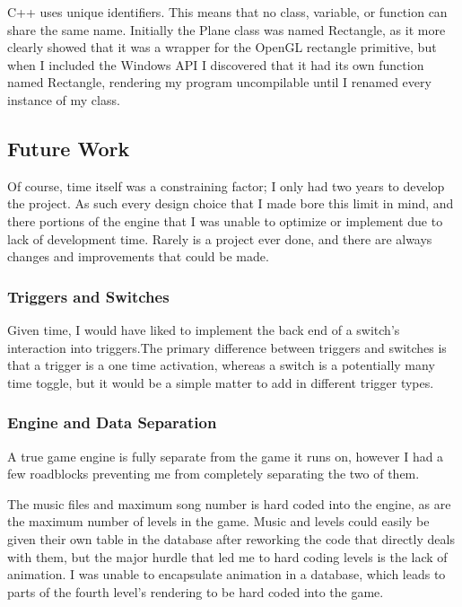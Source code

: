 \documentclass{article}
\begin{document}
C++ uses unique identifiers. This means that no class, variable, or function can share the same name. Initially the Plane class was named Rectangle, as it more clearly showed that it was a wrapper for the OpenGL rectangle primitive, but when I included the Windows API I discovered that it had its own function named Rectangle, rendering my program uncompilable until I renamed every instance of my class.

\subsection{Future Work} \label{subsec:future}

Of course, time itself was a constraining factor; I only had two years to develop the project. As such every design choice that I made bore this limit in mind, and there portions of the engine that I was unable to optimize or implement due to lack of development time. Rarely is a project ever done, and there are always changes and improvements that could be made.

\subsubsection{Triggers and Switches} \label{subsubsec:trigandswitch}

Given time, I would have liked to implement the back end of a switch's interaction into triggers.The primary difference between triggers and switches is that a trigger is a one time activation, whereas a switch is a potentially many time toggle, but it would be a simple matter to add in different trigger types.

\subsubsection{Engine and Data Separation} \label{subsubsec:seperation}

A true game engine is fully separate from the game it runs on, however I had a few roadblocks preventing me from completely separating the two of them.

The music files and maximum song number is hard coded into the engine, as are the maximum number of levels in the game. Music and levels could easily be given their own table in the database after reworking the code that directly deals with them, but the major hurdle that led me to hard coding levels is the lack of animation. I was unable to encapsulate animation in a database, which leads to parts of the fourth level's rendering to be hard coded into the game.
\end{document}

